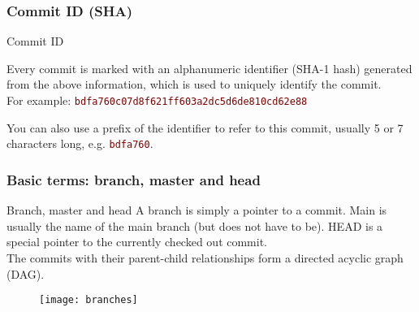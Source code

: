 \begin{frame}

\frametitle{Commit ID (SHA)}
\begin{block}{Commit ID}

	\smallskip Every commit is marked with an alphanumeric identifier (SHA-1 hash) generated from the above information, which is used to uniquely identify the commit. \\For example: \textcolor{Maroon}{\texttt{bdfa760c07d8f621ff603a2dc5d6de810cd62e88}}
\smallskip

You can also use a prefix of the identifier to refer to this commit, usually 5 or 7 characters long, e.g. \textcolor{Maroon}{\texttt{bdfa760}}.
\end{block}
\end{frame}


\begin{frame}

\frametitle{Basic terms: branch, master and head}

\begin{block}{Branch, master and head}
A \alert{branch} is simply a pointer to a commit. \alert{Main} is usually the name of the main branch (but does not have to be). \alert{HEAD} is a special pointer to the currently checked out commit. \\
\smallskip
The commits with their parent-child relationships form a directed acyclic graph (DAG).
\end{block}

\begin{figure}
\texttt{[image: branches]}
\end{figure}

\end{frame}


